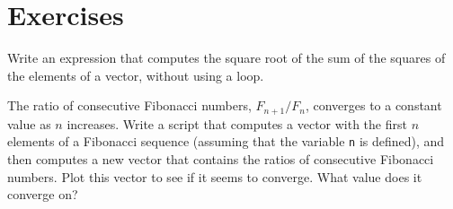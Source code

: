 \documentclass[
]{book}
\numberwithin{Answer}{chapter}
\numberwithin{Exercise}{chapter}
\begin{document}
\section{Exercises}

\begin{ex}
Write an expression that computes the square root of the sum of the squares of the elements of a vector, without using a loop.

\end{ex}

\begin{ex}
\label{ex:fibratio}

The ratio of consecutive Fibonacci numbers, $F_{n+1}/F_{n}$, converges
to a constant value as $n$ increases.  Write a script that computes
a vector with the first $n$ elements of a Fibonacci sequence (assuming
that the variable {\tt n} is defined), and then computes a new
vector that contains the ratios of consecutive Fibonacci numbers.
Plot this vector to see if it seems to converge.  What value does
it converge on?


\end{ex}
\end{document}
